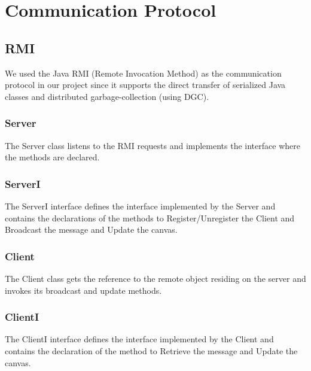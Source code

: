\chapter{Communication Protocol}
\section{RMI}
We used the Java RMI (Remote Invocation Method) as the communication protocol in our project since it supports the direct transfer of serialized Java classes and distributed garbage-collection (using DGC).
\subsection{Server}
The Server class listens to the RMI requests and implements the interface where the methods are declared.
\subsection{ServerI}
The ServerI interface defines the interface implemented by the Server and contains the declarations of the methods to Register/Unregister the Client and Broadcast the message and Update the canvas.
\subsection{Client}
The Client class gets the reference to the remote object residing on the server and invokes its broadcast and update methods.
\subsection{ClientI}
The ClientI interface defines the interface implemented by the Client and contains the declaration of the method to Retrieve the message and Update the canvas.

